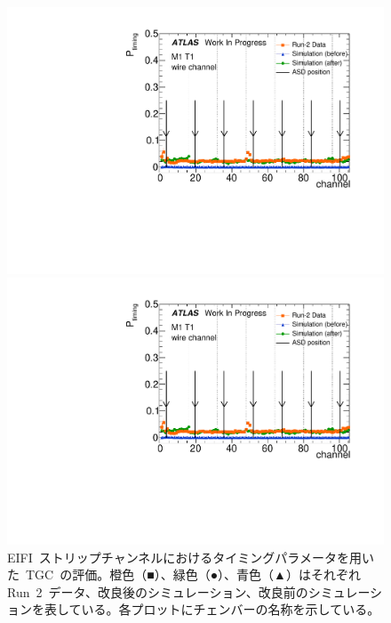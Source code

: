 \begin{figure}[htbp]
\begin{minipage}{0.49\hsize}
			\includegraphics[width=\textwidth,page=41]{img/pdf5/master_timingplot_comp.pdf}
			\end{minipage}
			\begin{minipage}{0.49\hsize}
			\centering
			\includegraphics[width=\textwidth,page=43]{img/pdf5/master_timingplot_comp.pdf}
			\end{minipage}
		\caption[EIFI~ストリップチャンネルにおけるタイミングパラメータを用いた~TGC~の評価。]{EIFI~ストリップチャンネルにおけるタイミングパラメータを用いた~TGC~の評価。橙色（■）、緑色（●）、青色（▲）はそれぞれRun~2~データ、改良後のシミュレーション、改良前のシミュレーションを表している。各プロットにチェンバーの名称を示している。}
		\label{fig:timingPlotCompStripEIFI}
	\end{figure}
	